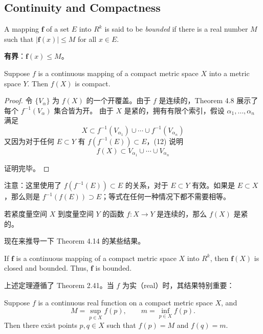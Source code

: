 \documentclass[../poma-notes.tex]{subfiles}
\begin{document}
\subsection*{Continuity and Compactness}

\begin{definition}
  A mapping $\mathbf{f}$ of a set $E$ into $R^k$ is said to be \textit{bounded} if there is a real number
  $M$ such that $|\mathbf{f}(x)| \le M$ for all $x \in E$.
\end{definition}

\begin{anote}
  \textbf{有界}：$\mathbf{f}(x) \le M$。
\end{anote}

\begin{theorem}
  Suppose $f$ is a continuous mapping of a compact metric space $X$ into a metric space $Y$. Then $f(X)$ is
  compact.
\end{theorem}

\begin{proof}
  令 $\{V_\alpha\}$ 为 $f(X)$ 的一个开覆盖。由于 $f$ 是连续的，Theorem 4.8 展示了每个 $f^{-1}(V_\alpha)$ 集合皆为开。
  由于 $X$ 是紧的，拥有有限个索引，假设 $\alpha_1,\dots,\alpha_n$ 满足
  \begin{equation}
    X \subset f^{-1}(V_{\alpha_1}) \cup \cdots \cup f^{-1}(V_{\alpha_n})
  \end{equation}
  又因为对于任何 $E \subset Y$ 有 $f(f^{-1}(E)) \subset E$，(12) 说明
  \begin{equation}
    f(X) \subset V_{\alpha_1} \cup \cdots \cup V_{\alpha_n}
  \end{equation}

  证明完毕。
\end{proof}

注意：这里使用了 $f(f^{-1}(E)) \subset E$ 的关系，对于 $E \subset Y$ 有效。如果是 $E \subset X$，那么则是
$f^{-1}(f(E)) \supset E$；等式在任何一种情况下都不需要相等。

\begin{anote}
  若紧度量空间 $X$ 到度量空间 $Y$ 的函数 $f: X \to Y$ 是连续的，那么 $f(X)$ 是紧的。
\end{anote}

现在来推导一下 Theorem 4.14 的某些结果。

\begin{theorem}
  If $\mathbf{f}$ is a continuous mapping of a compact metric space $X$ into $R^k$, then $\mathbf{f}(X)$
  is closed and bounded. Thus, $\mathbf{f}$ is bounded.
\end{theorem}

上述定理遵循了 Theorem 2.41。当 $f$ 为实（real）时，其结果特别重要：

\begin{theorem}
  Suppose $f$ is a continuous real function on a compact metric space $X$, and
  \begin{equation}
    M = \sup_{p \in X} f(p), \qquad m = \inf_{p \in X} f(p).
  \end{equation}
  Then there exist points $p, q \in X$ such that $f(p) = M$ and $f(q) = m$.
\end{theorem}

\end{document}
